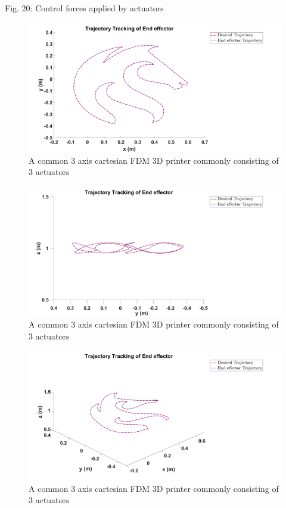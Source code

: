 \documentclass{UoNMCHA}
\numberwithin{equation}{section}
\begin{document}
	
	Fig. 20: Control forces applied by actuators 
	
	\begin{figure}[H]
		\begin{center}
			\includegraphics[width=.8\linewidth]{figs/Picture32}
			\caption{A  common 3 axis cartesian FDM 3D printer commonly consisting of 3 actuators}
			\label{figs/Picture32}
		\end{center}
	\end{figure}
	
	\begin{figure}[H]
		\begin{center}
			\includegraphics[width=.8\linewidth]{figs/Picture322}
			\caption{A  common 3 axis cartesian FDM 3D printer commonly consisting of 3 actuators}
			\label{figs/Picture322}
		\end{center}
	\end{figure}
	
	\begin{figure}[H]
		\begin{center}
			\includegraphics[width=.8\linewidth]{figs/Picture323}
			\caption{A  common 3 axis cartesian FDM 3D printer commonly consisting of 3 actuators}
			\label{figs/Picture323}
		\end{center}
	\end{figure}
	
\end{document}
